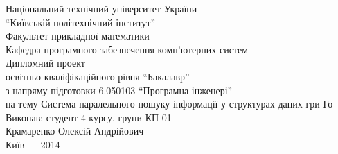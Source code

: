 \begin{titlepage}
	\begin{center}
		Національний технічний університет України\\
		``Київській політехнічний інститут''\\
		Факультет прикладної математики\\
		Кафедра програмного забезпечення комп'ютерних систем\\
		Дипломний проект\\
		освітньо-кваліфікаційного рівня ``Бакалавр''\\
		з напряму підготовки 6.050103 ``Програмна інженері''\\
		на тему
		Система паралельного пошуку інформації у структурах даних гри Го\\
		Виконав: студент 4 курсу, групи КП-01\\
		Крамаренко Олексій Андрійович\\
		\vfill
		Київ --- 2014
	\end{center}
\end{titlepage}
